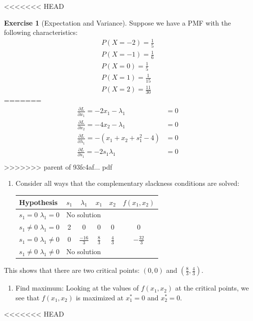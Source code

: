 \documentclass[]{book}
\providecommand{\tightlist}{%
  \setlength{\itemsep}{0pt}\setlength{\parskip}{0pt}}
\theoremstyle{definition}
\theoremstyle{definition}
\theoremstyle{definition}
\newtheorem{exercise}{Exercise}[chapter]
\theoremstyle{remark}
\begin{document}
<<<<<<< HEAD
\begin{exercise}[Expectation and Variance]
\protect\hypertarget{exr:expvar}{}{\label{exr:expvar} {} }
Suppose we have a PMF with the following characteristics:
\begin{eqnarray*}
  P(X = -2) = \frac{1}{5}\\
  P(X = -1) = \frac{1}{6}\\
  P(X = 0) = \frac{1}{5}\\
  P(X = 1) = \frac{1}{15}\\
  P(X = 2) = \frac{11}{30}
\end{eqnarray*}
=======
\begin{align*}
\frac{\partial L}{\partial x_1} = -2x_1 - \lambda_1  &= 0\\
\frac{\partial L}{\partial x_2}  = -4x_2 - \lambda_1 &=  0\\
\frac{\partial L}{\partial \lambda_1} = -(x_1 + x_2 + s_1^2 - 4)&= 0\\
\frac{\partial L}{\partial s_1} = -2s_1\lambda_1 &= 0\\
\end{align*}
>>>>>>> parent of 93fc4af... pdf

\begin{enumerate}
\def\labelenumi{\arabic{enumi}.}
\setcounter{enumi}{3}
\tightlist
\item
  Consider all ways that the complementary slackness conditions are solved:

  \begin{center}
  \begin{tabular}{|l|cccc|c|}
  \hline
  Hypothesis & $s_1$ & $\lambda_1$ & $x_1$ & $x_2$ & $f(x_1, x_2)$\\
  \hline
  $s_1 = 0$ $\lambda_1 = 0$ & \multicolumn{4}{l|}{No solution} & \\
  $s_1 \neq 0$ $\lambda_1 = 0$ & 2 & 0 & 0 & 0  & 0\\
  $s_1 = 0$ $\lambda_1 \neq 0$ & 0 & $\frac{-16}{3}$ & $\frac{8}{3}$ & $\frac{4}{3}$ & $-\frac{32}{3}$\\
  $s_1 \neq 0$ $\lambda_1 \neq 0$ & \multicolumn{4}{l|}{No solution} &\\
  \hline
  \end{tabular}
  \end{center}
\end{enumerate}

This shows that there are two critical points: \((0,0)\) and \((\frac{8}{3},\frac{4}{3})\).

\begin{enumerate}
\def\labelenumi{\arabic{enumi}.}
\setcounter{enumi}{4}
\tightlist
\item
  Find maximum:
  Looking at the values of \(f(x_1,x_2)\) at the critical points, we see that \(f(x_1,x_2)\) is maximized at \(x_1^* = 0\) and \(x_2^*=0\).
\end{enumerate}
<<<<<<< HEAD
\end{exercise}
\end{document}
